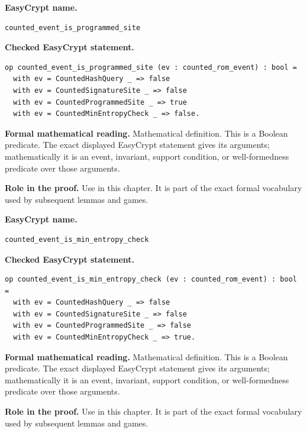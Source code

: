 \begin{formaldefinition}
\noindent\textbf{EasyCrypt name.}
\begin{lstlisting}[language=EasyCrypt,basicstyle=\ttfamily\scriptsize]
counted_event_is_programmed_site
\end{lstlisting}
\noindent\textbf{Checked EasyCrypt statement.}
\begin{lstlisting}[language=EasyCrypt,basicstyle=\ttfamily\scriptsize]
op counted_event_is_programmed_site (ev : counted_rom_event) : bool =
  with ev = CountedHashQuery _ => false
  with ev = CountedSignatureSite _ => false
  with ev = CountedProgrammedSite _ => true
  with ev = CountedMinEntropyCheck _ => false.
\end{lstlisting}
\noindent\textbf{Formal mathematical reading.}
Mathematical definition. This is a Boolean predicate.  The exact displayed EasyCrypt statement gives its arguments; mathematically it is an event, invariant, support condition, or well-formedness predicate over those arguments.

\noindent\textbf{Role in the proof.}
Use in this chapter. It is part of the exact formal vocabulary used by subsequent lemmas and games.

\end{formaldefinition}

\begin{formaldefinition}
\noindent\textbf{EasyCrypt name.}
\begin{lstlisting}[language=EasyCrypt,basicstyle=\ttfamily\scriptsize]
counted_event_is_min_entropy_check
\end{lstlisting}
\noindent\textbf{Checked EasyCrypt statement.}
\begin{lstlisting}[language=EasyCrypt,basicstyle=\ttfamily\scriptsize]
op counted_event_is_min_entropy_check (ev : counted_rom_event) : bool =
  with ev = CountedHashQuery _ => false
  with ev = CountedSignatureSite _ => false
  with ev = CountedProgrammedSite _ => false
  with ev = CountedMinEntropyCheck _ => true.
\end{lstlisting}
\noindent\textbf{Formal mathematical reading.}
Mathematical definition. This is a Boolean predicate.  The exact displayed EasyCrypt statement gives its arguments; mathematically it is an event, invariant, support condition, or well-formedness predicate over those arguments.

\noindent\textbf{Role in the proof.}
Use in this chapter. It is part of the exact formal vocabulary used by subsequent lemmas and games.

\end{formaldefinition}

